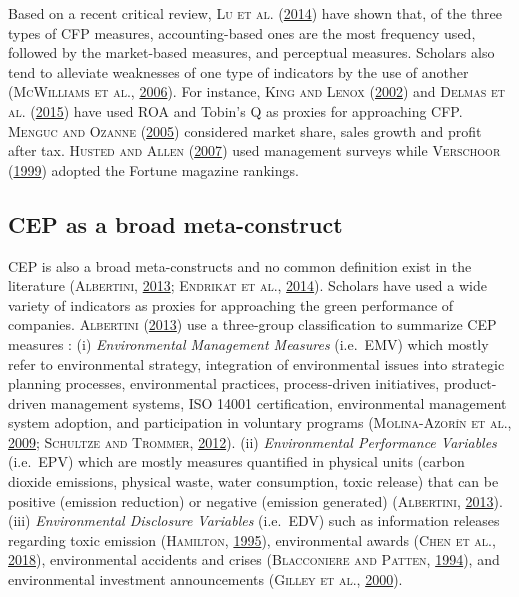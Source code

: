 \documentclass[12pt,]{article}
\begin{document}
Based on a recent critical review, \textsc{Lu et al.}
(\protect\hyperlink{ref-Ludecadedebatenexus2014}{2014}) have shown that,
of the three types of CFP measures, accounting-based ones are the most
frequency used, followed by the market-based measures, and perceptual
measures. Scholars also tend to alleviate weaknesses of one type of
indicators by the use of another (\textsc{McWilliams et al.},
\protect\hyperlink{ref-McWilliams2006}{2006}). For instance,
\textsc{King and Lenox} (\protect\hyperlink{ref-King2002}{2002}) and
\textsc{Delmas et al.} (\protect\hyperlink{ref-Delmas2015}{2015}) have
used ROA and Tobin's Q as proxies for approaching CFP. \textsc{Menguc
and Ozanne} (\protect\hyperlink{ref-Menguc2005}{2005}) considered market
share, sales growth and profit after tax. \textsc{Husted and Allen}
(\protect\hyperlink{ref-Husted2007}{2007}) used management surveys while
\textsc{Verschoor} (\protect\hyperlink{ref-Verschoor1999}{1999}) adopted
the Fortune magazine rankings.

\subsection{CEP as a broad
meta-construct}\label{cep-as-a-broad-meta-construct}

CEP is also a broad meta-constructs and no common definition exist in
the literature (\textsc{Albertini},
\protect\hyperlink{ref-Albertini2013}{2013}; \textsc{Endrikat et al.},
\protect\hyperlink{ref-EndrikatMakingsenseconflicting2014}{2014}).
Scholars have used a wide variety of indicators as proxies for
approaching the green performance of companies. \textsc{Albertini}
(\protect\hyperlink{ref-Albertini2013}{2013}) use a three-group
classification to summarize CEP measures : (i) \emph{Environmental
Management Measures} (i.e.~EMV) which mostly refer to environmental
strategy, integration of environmental issues into strategic planning
processes, environmental practices, process-driven initiatives,
product-driven management systems, ISO 14001 certification,
environmental management system adoption, and participation in voluntary
programs (\textsc{Molina-Azorín et al.},
\protect\hyperlink{ref-Molina-Azorin2009}{2009}; \textsc{Schultze and
Trommer}, \protect\hyperlink{ref-Schultze2012}{2012}). (ii)
\emph{Environmental Performance Variables} (i.e.~EPV) which are mostly
measures quantified in physical units (carbon dioxide emissions,
physical waste, water consumption, toxic release) that can be positive
(emission reduction) or negative (emission generated)
(\textsc{Albertini}, \protect\hyperlink{ref-Albertini2013}{2013}). (iii)
\emph{Environmental Disclosure Variables} (i.e.~EDV) such as information
releases regarding toxic emission (\textsc{Hamilton},
\protect\hyperlink{ref-Hamilton1995}{1995}), environmental awards
(\textsc{Chen et al.},
\protect\hyperlink{ref-Chencrosscountrycomparisongreen2018}{2018}),
environmental accidents and crises (\textsc{Blacconiere and Patten},
\protect\hyperlink{ref-Blacconiere1994}{1994}), and environmental
investment announcements (\textsc{Gilley et al.},
\protect\hyperlink{ref-Gilley2000}{2000}).
\end{document}

